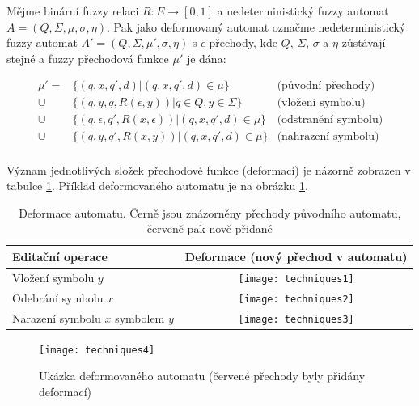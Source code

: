 \documentclass[a4paper,10pt]{article}
\begin{document}
\begin{definition} \label{def-AutRozpCalL}
 Mějme binární fuzzy relaci $R: E \rightarrow [0, 1]$ a nedeterministický fuzzy automat $A = (Q, \Sigma, \mu, \sigma, \eta)$. Pak jako deformovaný automat označme nedeterministický fuzzy automat $A' = (Q, \Sigma, \mu', \sigma, \eta)$ s $\epsilon$-přechody, kde $Q$, $\Sigma$, $\sigma$ a $\eta$ zůstávají stejné a fuzzy přechodová funkce $\mu'$ je dána:
 
 \begin{align*}
  \mu' = 	& \{ (q, x, q', d) | (q, x, q', d) \in \mu \} 			& \text{(původní přechody)}	\\
    \cup 	& \{ (q, y, q, R(\epsilon, y)) | q \in Q, y \in \Sigma \} 	& \text{(vložení symbolu)}	\\
    \cup 	& \{ (q, \epsilon, q', R(x, \epsilon)) | (q, x, q', d) \in \mu \} & \text{(odstranění symbolu)}	\\
    \cup 	& \{ (q, y, q', R(x, y)) | (q, x, q', d) \in \mu \} 	& \text{(nahrazení symbolu)}\\
  \end{align*}
\end{definition}

Význam jednotlivých složek přechodové funkce (deformací) je názorně zobrazen v tabulce \ref{tbl:DefAutDef}. Příklad deformovaného automatu je na obrázku \ref{img:DefAut}.  

\begin{table}
 \begin{tabular}{|l|c|}
  \hline
  Editační operace 	& Deformace (nový přechod v automatu)	 \\
  \hline
  Vložení symbolu $y$ 			& \texttt{[image: techniques1]} \\
  \hline
  Odebrání symbolu $x$ 			& \texttt{[image: techniques2]} \\
  \hline
  Narazení symbolu $x$ symbolem $y$ 	& \texttt{[image: techniques3]} \\
  \hline
 \end{tabular}
 \caption{Deformace automatu. Černě jsou znázorněny přechody původního automatu, červeně pak nově přidané}\label{tbl:DefAutDef}
\end{table}

\begin{figure}
  \texttt{[image: techniques4]}
  \caption{Ukázka deformovaného automatu (červené přechody byly přidány deformací)} \label{img:DefAut}
\end{figure}
 
\end{document}
